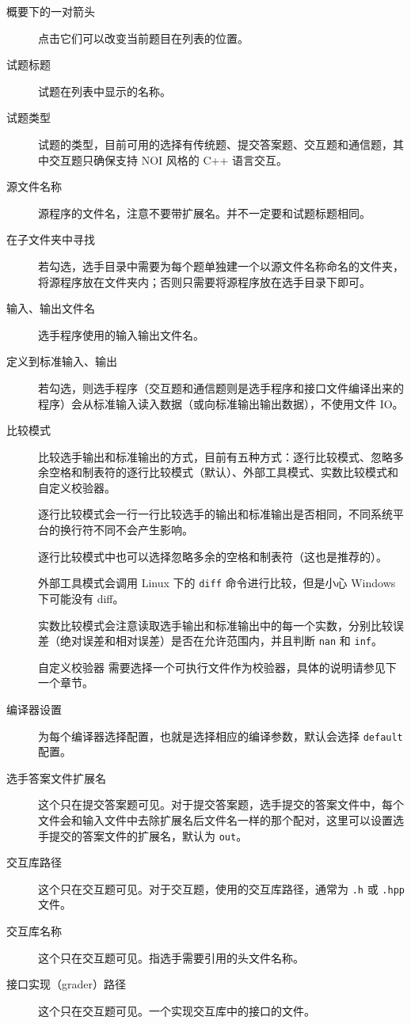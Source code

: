 \documentclass[UTF-8]{ctexart}
\begin{document}
			\begin{description}
				\item[概要下的一对箭头] 点击它们可以改变当前题目在列表的位置。
				\item[试题标题] 试题在列表中显示的名称。
				\item[试题类型] 试题的类型，目前可用的选择有传统题、提交答案题、交互题和通信题，其中交互题只确保支持 NOI 风格的 C++ 语言交互。
				\item[源文件名称] 源程序的文件名，注意不要带扩展名。并不一定要和试题标题相同。
				\item[在子文件夹中寻找] 若勾选，选手目录中需要为每个题单独建一个以源文件名称命名的文件夹，将源程序放在文件夹内；否则只需要将源程序放在选手目录下即可。
				\item[输入、输出文件名] 选手程序使用的输入输出文件名。
				\item[定义到标准输入、输出] 若勾选，则选手程序（交互题和通信题则是选手程序和接口文件编译出来的程序）会从标准输入读入数据（或向标准输出输出数据），不使用文件 IO。
				\item[比较模式] 比较选手输出和标准输出的方式，目前有五种方式：逐行比较模式、忽略多余空格和制表符的逐行比较模式（默认）、外部工具模式、实数比较模式和自定义校验器。

				逐行比较模式会一行一行比较选手的输出和标准输出是否相同，不同系统平台的换行符不同不会产生影响。

				逐行比较模式中也可以选择忽略多余的空格和制表符（这也是推荐的）。

				外部工具模式会调用 Linux 下的 \texttt{diff} 命令进行比较，但是小心 Windows 下可能没有 diff。

				实数比较模式会注意读取选手输出和标准输出中的每一个实数，分别比较误差（绝对误差和相对误差）是否在允许范围内，并且判断 \texttt{nan} 和 \texttt{inf}。

				自定义校验器 需要选择一个可执行文件作为校验器，具体的说明请参见下一个章节。
				\item[编译器设置] 为每个编译器选择配置，也就是选择相应的编译参数，默认会选择 \texttt{default} 配置。

				\item[选手答案文件扩展名] 这个只在提交答案题可见。对于提交答案题，选手提交的答案文件中，每个文件会和输入文件中去除扩展名后文件名一样的那个配对，这里可以设置选手提交的答案文件的扩展名，默认为 \texttt{out}。

				\item[交互库路径] 这个只在交互题可见。对于交互题，使用的交互库路径，通常为 \texttt{.h} 或 \texttt{.hpp} 文件。
				\item[交互库名称] 这个只在交互题可见。指选手需要引用的头文件名称。
				\item[接口实现（grader）路径] 这个只在交互题可见。一个实现交互库中的接口的文件。


\end{description}
\end{document}
